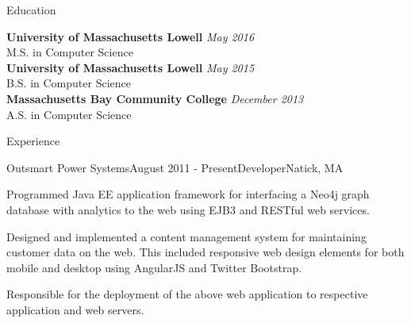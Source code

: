 \documentclass{resume} %
\begin{document}

\begin{rSection}{Education}

{\bf University of Massachusetts Lowell} \hfill {\em May 2016} \\ 
M.S. in Computer Science  \smallskip \\
{\bf University of Massachusetts Lowell} \hfill {\em May 2015} \\ 
B.S. in Computer Science  \smallskip \\
{\bf Massachusetts Bay Community College} \hfill {\em December 2013} \\ 
A.S. in Computer Science  \smallskip \\

\end{rSection}


\begin{rSection}{Experience}


\begin{rSubsection}{Outsmart Power Systems}{August 2011 - Present}{Developer}{Natick, MA}
\item Programmed Java EE application framework for interfacing a Neo4j graph database with analytics to the web using EJB3 and RESTful web services.
\item Designed and implemented a content management system for maintaining customer data on the web. This included responsive web design elements for both mobile and desktop using AngularJS and Twitter Bootstrap.
\item Responsible for the deployment of the above web application to respective application and web servers.
\end{rSubsection}



\end{rSection}
\end{document}
